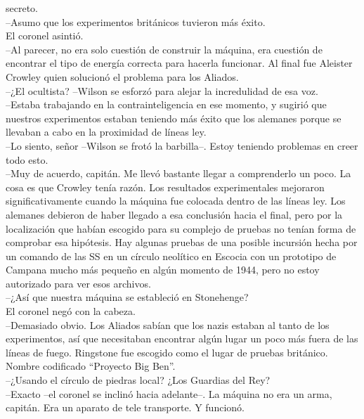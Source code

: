 secreto.\\
--Asumo que los experimentos británicos tuvieron más éxito.\\
El coronel asintió.\\
--Al parecer, no era solo cuestión de construir la máquina, era cuestión
de encontrar el tipo de energía correcta para hacerla funcionar. Al
final fue Aleister Crowley quien solucionó el problema para los
Aliados.\\
--¿El ocultista? --Wilson se esforzó para alejar la incredulidad de esa
voz.\\
--Estaba trabajando en la contrainteligencia en ese momento, y sugirió
que nuestros experimentos estaban teniendo más éxito que los alemanes
porque se llevaban a cabo en la proximidad de líneas ley.\\
--Lo siento, señor --Wilson se frotó la barbilla--. Estoy teniendo
problemas en creer todo esto.\\
--Muy de acuerdo, capitán. Me llevó bastante llegar a comprenderlo un
poco. La cosa es que Crowley tenía razón. Los resultados experimentales
mejoraron significativamente cuando la máquina fue colocada dentro de
las líneas ley. Los alemanes debieron de haber llegado a esa conclusión
hacia el final, pero por la localización que habían escogido para su
complejo de pruebas no tenían forma de comprobar esa hipótesis. Hay
algunas pruebas de una posible incursión hecha por un comando de las SS
en un círculo neolítico en Escocia con un prototipo de Campana mucho más
pequeño en algún momento de 1944, pero no estoy autorizado para ver esos
archivos.\\
--¿Así que nuestra máquina se estableció en Stonehenge?\\
El coronel negó con la cabeza.\\
--Demasiado obvio. Los Aliados sabían que los nazis estaban al tanto de
los experimentos, así que necesitaban encontrar algún lugar un poco más
fuera de las líneas de fuego. Ringstone fue escogido como el lugar de
pruebas británico. Nombre codificado ``Proyecto Big Ben''.\\
--¿Usando el círculo de piedras local? ¿Los Guardias del Rey?\\
--Exacto --el coronel se inclinó hacia adelante--. La máquina no era un
arma, capitán. Era un aparato de tele transporte. Y funcionó.\\
